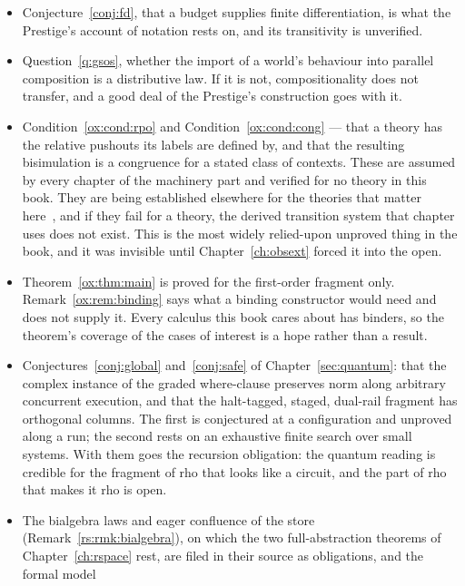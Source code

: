 \begin{itemize}[leftmargin=1.6em, itemsep=4pt]
\item Conjecture~\ref{conj:fd}, that a budget supplies finite
      differentiation, is what the Prestige's account of notation
      rests on, and its transitivity is unverified.
\item Question~\ref{q:gsos}, whether the import of a world's
      behaviour into parallel composition is a distributive law.
      If it is not, compositionality does not transfer, and a
      good deal of the Prestige's construction goes with it.
\item Condition~\ref{ox:cond:rpo} and Condition~\ref{ox:cond:cong}
      --- that a theory has the relative pushouts its labels are
      defined by, and that the resulting bisimulation is a
      congruence for a stated class of contexts.
      These are assumed by every chapter of the machinery part and
      verified for no theory in this book.
      They are being established elsewhere for the theories that
      matter here~\cite{BIHOL}, and if they fail for a theory, the
      derived transition system that chapter uses does not exist.
      This is the most widely relied-upon unproved thing in the
      book, and it was invisible until Chapter~\ref{ch:obsext}
      forced it into the open.
\item Theorem~\ref{ox:thm:main} is proved for the first-order
      fragment only.
      Remark~\ref{ox:rem:binding} says what a binding constructor
      would need and does not supply it.
      Every calculus this book cares about has binders, so the
      theorem's coverage of the cases of interest is a hope rather
      than a result.
\item Conjectures~\ref{conj:global} and~\ref{conj:safe} of
      Chapter~\ref{sec:quantum}: that the complex instance of the
      graded where-clause preserves norm along arbitrary concurrent
      execution, and that the halt-tagged, staged, dual-rail fragment
      has orthogonal columns.
      The first is conjectured at a configuration and unproved along a
      run; the second rests on an exhaustive finite search over small
      systems.
      With them goes the recursion obligation: the quantum reading is
      credible for the fragment of rho that looks like a circuit, and
      the part of rho that makes it rho is open.
\item The bialgebra laws and eager confluence of the store
      (Remark~\ref{rs:rmk:bialgebra}), on which the two
      full-abstraction theorems of Chapter~\ref{ch:rspace} rest, are
      filed in their source as obligations, and the formal model

\end{itemize}
